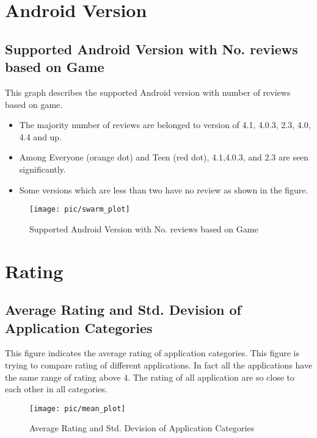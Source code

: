 \section*{Android Version}
\subsection*{Supported Android Version with No. reviews based on Game}
This graph describes the supported Android version with number of reviews based on game.
\begin{itemize}
\item The majority number of reviews are belonged to version of 4.1, 4.0.3, 2.3, 4.0, 4.4 and up.\\
\item Among Everyone (orange dot) and Teen (red dot), 4.1,4.0.3, and 2.3 are seen significantly.\\
\item Some versions which are less than two have no review as shown in the figure.\\
\end{itemize}

\begin{figure}
\centering
\texttt{[image: pic/swarm\_plot]}
\caption{Supported Android Version with No. reviews based on Game}
\label{fig:5}
\end{figure}

\section*{Rating}
\subsection*{Average Rating and Std. Devision of Application Categories}
This figure indicates the average rating of application categories. This figure is trying to compare rating of different applications. In fact all the applications have the same range of rating above 4. The rating of all application are so close to each other in all categories.
\begin{figure}
\centering
\texttt{[image: pic/mean\_plot]}
\caption{Average Rating and Std. Devision of Application Categories} 
\label{fig:6}
\end{figure}

